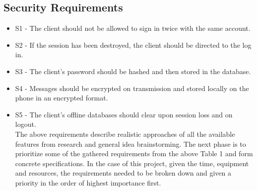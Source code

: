 \documentclass{article}
\begin{document}
\subsection{Security Requirements}
\begin{itemize}
	\item S1 - The client should not be allowed to sign in twice with the same account.
	\item S2 - If the session has been destroyed, the client should be directed to the log in.
	\item S3 - The client's password should be hashed and then stored in the database. 
	\item S4 - Messages should be encrypted on transmission and stored locally on the phone in an encrypted format.
	\item S5 - The client's offline databases should clear upon session loss and on logout.\\

	The above requirements describe realistic approaches of all the available features from research and general idea brainstorming. The next phase is to prioritize some of the gathered requirements from the above Table 1 and form concrete specifications. In the case of this project, given the time, equipment and resources, the requirements needed to be broken down and given a priority in the order of highest importance first. 
	
\end{itemize}
\end{document}
